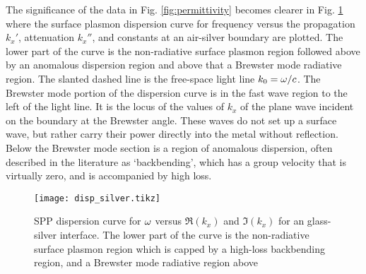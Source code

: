 The significance of the data in Fig. \ref{fig:permittivity} becomes clearer in Fig. \ref{fig:dispersion} where the surface plasmon dispersion curve for frequency versus the propagation $k_x'$, attenuation $k_x''$, and constants at an air-silver boundary are plotted. The lower part of the curve is the non-radiative surface plasmon region followed above by an anomalous dispersion region and above that a Brewster mode radiative region. The slanted dashed line is the free-space light line $k_0 = \omega/c$. The Brewster mode portion of the dispersion curve is in the fast wave region to the left of the light line. It is the locus of the values of $k_x$ of the plane wave incident on the boundary at the Brewster angle. These waves do not set up a surface wave, but rather carry their power directly into the metal without reflection. Below the Brewster mode section is a region of anomalous dispersion, often described in the literature as `backbending', which has a group velocity that is virtually zero, and is accompanied by high loss.
%
\begin{figure}[t!]
  \centering
  {\texttt{[image: disp\_silver.tikz]}}
  \caption{SPP dispersion curve for $\omega$ versus $\Re (k_x)$ and $\Im (k_x)$ for an glass-silver interface. The lower part of the curve is the non-radiative surface plasmon region which is capped by a high-loss backbending region, and a Brewster mode radiative region above}
  \label{fig:dispersion}
\end{figure}
%

